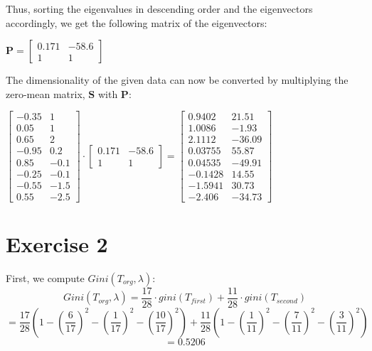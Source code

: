 \documentclass{report}
\begin{document}
Thus, sorting the eigenvalues in descending order and the eigenvectors accordingly, we get the following matrix of the eigenvectors:
\begin{center}
    \begin{math}
        \bm{P} =
        \left[
            \begin{array}{cc}
                0.171 & -58.6 \\
                1 & 1
            \end{array}
        \right]
    \end{math}
\end{center}
The dimensionality of the given data can now be converted by multiplying the zero-mean matrix, $\bm{S}$ with $\bm{P}$:
\begin{center}
    \begin{math}
        \begin{bmatrix}
            -0.35 & 1 \\
            0.05 & 1 \\
            0.65 & 2 \\
            -0.95 & 0.2 \\
            0.85 & -0.1 \\
            -0.25 & -0.1 \\
            -0.55 & -1.5 \\
            0.55 & -2.5
        \end{bmatrix}
        \cdot
        \left[
            \begin{array}{cc}
                0.171 & -58.6 \\
                1 & 1
            \end{array}
        \right]
        =
        \begin{bmatrix}
            0.9402 & 21.51 \\
            1.0086 & -1.93 \\
            2.1112 & -36.09 \\
            0.03755 & 55.87 \\
            0.04535 & -49.91 \\
            -0.1428 & 14.55 \\
            -1.5941 & 30.73 \\
            -2.406 & -34.73
        \end{bmatrix}
    \end{math}
\end{center}

\section*{Exercise 2}
First, we compute $Gini(T_{org}, \lambda)$:
$$Gini(T_{org}, \lambda) = \frac{17}{28} \cdot gini(T_{first}) + \frac{11}{28} \cdot gini(T_{second})$$
$$= \frac{17}{28} \left(1 - \left(\frac{6}{17}\right)^2 - \left( \frac{1}{17} \right)^2 - \left( \frac{10}{17} \right)^2 \right) + \frac{11}{28} \left(1 - \left( \frac{1}{11} \right)^2 - \left( \frac{7}{11} \right)^2 - \left( \frac{3}{11} \right)^2 \right)$$
$$ = 0.5206$$
\end{document}
